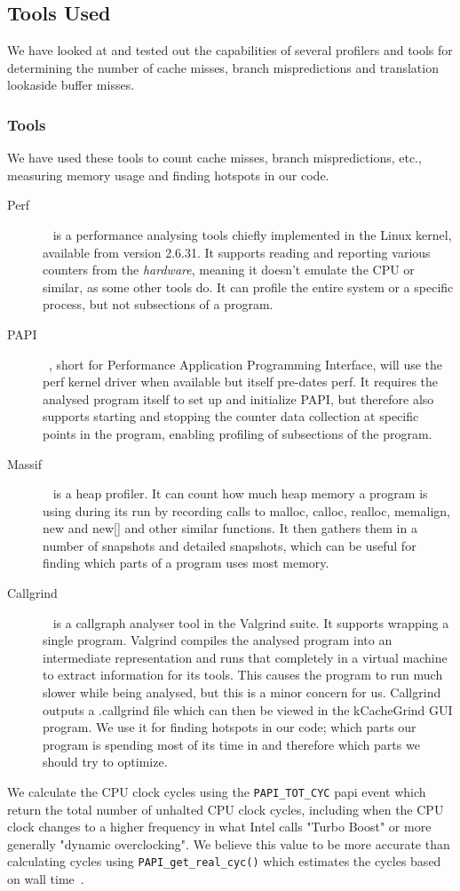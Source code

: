 \subsection{Tools Used}
We have looked at and tested out the capabilities of several profilers and tools for determining the number of cache misses, branch mispredictions and translation lookaside buffer misses.


\subsubsection{Tools}
We have used these tools to count cache misses, branch mispredictions, etc., measuring memory usage and finding hotspots in our code.
\begin{description}
\item[Perf]~\citep{perftool} is a performance analysing tools chiefly implemented in the Linux kernel, available from version 2.6.31.
It supports reading and reporting various counters from the \textit{hardware}, meaning it doesn't emulate the CPU or similar, as some other tools do.
It can profile the entire system or a specific process, but not subsections of a program.
\item[PAPI]~\citep{PAPI}, short for Performance Application Programming Interface, will use the perf kernel driver when available but itself pre-dates perf.
It requires the analysed program itself to set up and initialize PAPI, but therefore also supports starting and stopping the counter data collection at specific points in the program, enabling profiling of subsections of the program.
\item[Massif]~\citep{massif} is a heap profiler. It can count how much heap memory a program is using during its run by recording calls to malloc, calloc, realloc, memalign, new and new[] and other similar functions.
It then gathers them in a number of snapshots and detailed snapshots, which can be useful for finding which parts of a program uses most memory.
\item[Callgrind]~\citep{callgrind} is a callgraph analyser tool in the Valgrind suite.
It supports wrapping a single program.
Valgrind compiles the analysed program into an intermediate representation and runs that completely in a virtual machine to extract information for its tools.
This causes the program to run much slower while being analysed, but this is a minor concern for us.
Callgrind outputs a .callgrind file which can then be viewed in the kCacheGrind GUI program.
We use it for finding hotspots in our code; which parts our program is spending most of its time in and therefore which parts we should try to optimize.
\end{description}
We calculate the CPU clock cycles using the \texttt{PAPI\_TOT\_CYC} papi event which return the total number of unhalted CPU clock cycles, including when the CPU clock changes to a higher frequency in what Intel calls "Turbo Boost" or more generally "dynamic overclocking".
We believe this value to be more accurate than calculating cycles using \texttt{PAPI\_get\_real\_cyc()} which estimates the cycles based on wall time~\citep{PAPI-get-real-cyc}. 

